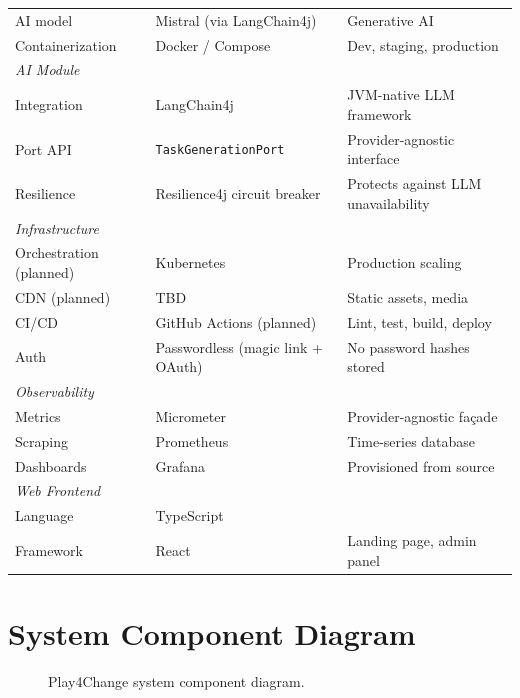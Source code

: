 \begin{table}[ht]
\begin{tabular}{lll}
    AI model     & Mistral (via LangChain4j) & Generative AI \\
    Containerization & Docker / Compose & Dev, staging, production \\
    \midrule
    \multicolumn{3}{l}{\textit{AI Module}} \\
    Integration  & LangChain4j & JVM-native LLM framework \\
    Port API     & \texttt{TaskGenerationPort} & Provider-agnostic interface \\
    Resilience   & Resilience4j circuit breaker & Protects against LLM unavailability \\
    \midrule
    \multicolumn{3}{l}{\textit{Infrastructure}} \\
    Orchestration (planned) & Kubernetes & Production scaling \\
    CDN (planned) & TBD & Static assets, media \\
    CI/CD        & GitHub Actions (planned) & Lint, test, build, deploy \\
    Auth         & Passwordless (magic link + OAuth) & No password hashes stored \\
    \midrule
    \multicolumn{3}{l}{\textit{Observability}} \\
    Metrics      & Micrometer & Provider-agnostic façade \\
    Scraping     & Prometheus & Time-series database \\
    Dashboards   & Grafana & Provisioned from source \\
    \midrule
    \multicolumn{3}{l}{\textit{Web Frontend}} \\
    Language     & TypeScript & \\
    Framework    & React & Landing page, admin panel \\
    \bottomrule
    \end{tabular}
\end{table}

\section{System Component Diagram}
\label{app:component_diagram}

\begin{figure}[htbp]
    \centering
    \caption{Play4Change system component diagram.}
    \label{fig:app_component}
\end{figure}


